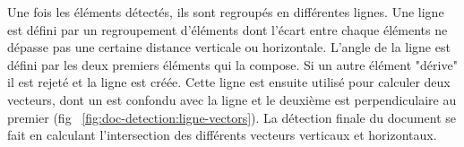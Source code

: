 Une fois les éléments détectés, ils sont regroupés en différentes lignes. %
Une ligne est défini par un regroupement d'éléments dont l'écart entre chaque éléments ne dépasse pas une certaine distance verticale ou horizontale. L'angle de la ligne est défini par les deux premiers éléments qui la compose. Si un autre élément "dérive" il est rejeté et la ligne est créée. Cette ligne est ensuite utilisé pour calculer deux vecteurs, dont un est confondu avec la ligne et le deuxième est perpendiculaire au premier (fig ~\ref{fig:doc-detection:ligne-vectors}).
La détection finale du document se fait en calculant l'intersection des différents vecteurs verticaux et horizontaux.




